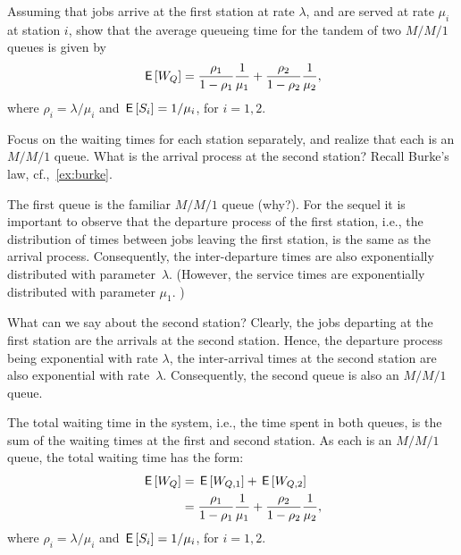 \begin{exercise}
Assuming that jobs arrive at the first station at rate $\lambda$, and are served at rate $\mu_i$ at station $i$, show that the average queueing time for the tandem of two $M/M/1$ queues is given by
\begin{equation}
\,\mathsf{E}\left[W_Q\right] = \frac{\rho_1}{1-\rho_1} \frac1{\mu_1} + \frac{\rho_2}{1-\rho_2} \frac1{\mu_2},
\end{equation}
where $\rho_i = \lambda/\mu_i$ and $\,\mathsf{E}\left[S_i\right] = 1/\mu_i$, for $i=1,2$. 
\begin{hint}
Focus on the waiting times for each station separately, and realize that each is an $M/M/1$ queue. What is the arrival process at the second station? Recall Burke's law, cf.,~\cref{ex:burke}.
\end{hint}
\begin{solution}
The first queue is the familiar $M/M/1$ queue (why?). For the sequel
it is important to observe that the departure process of the first
station, i.e., the distribution of times between jobs leaving the
first station, is the same as the arrival process. Consequently, the
inter-departure times are also exponentially distributed with parameter~$\lambda$. (However, the service times are exponentially distributed
with parameter $\mu_1$. ) 

What can we say about the second station? Clearly, the jobs departing
at the first station are the arrivals at the second station. Hence,
the departure process being exponential with rate $\lambda$, the
inter-arrival times at the second station are also exponential with
rate~$\lambda$. Consequently, the second queue is also an $M/M/1$
queue.

The total waiting time in the
system, i.e., the time spent in both queues, is the sum of the waiting
times at the first and second station. As each is an $M/M/1$ queue,
the total waiting time has the form:
\begin{equation}
 \begin{split}
\,\mathsf{E}\left[W_Q\right] &= \,\mathsf{E}\left[W_{Q,1}\right] + \,\mathsf{E}\left[W_{Q,2}\right] \\
&= \frac{\rho_1}{1-\rho_1} \frac1{\mu_1} + \frac{\rho_2}{1-\rho_2} \frac1{\mu_2},
 \end{split}
\end{equation}
where $\rho_i = \lambda/\mu_i$ and $\,\mathsf{E}\left[S_i\right] = 1/\mu_i$, for $i=1,2$. 
\end{solution}
\end{exercise}


